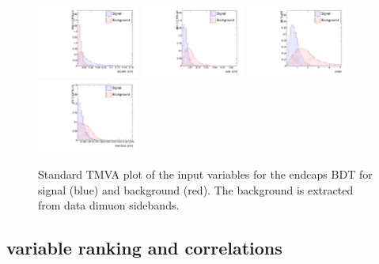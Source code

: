 \begin{figure}
  \includegraphics[width=0.3\textwidth]{Figures/docatrk_endcaps}
  \includegraphics[width=0.3\textwidth]{Figures/pvip_endcaps}
  \includegraphics[width=0.3\textwidth]{Figures/pvips_endcaps}
  \includegraphics[width=0.3\textwidth]{Figures/maxdoca_endcaps}
  \caption{Standard TMVA plot of the input variables for the endcaps BDT for signal (blue) and background (red). The background is extracted from data dimuon sidebands.}
  \label{fig:TMVAPlotsEndcaps}
\end{figure}



\subsection{variable ranking and correlations}

